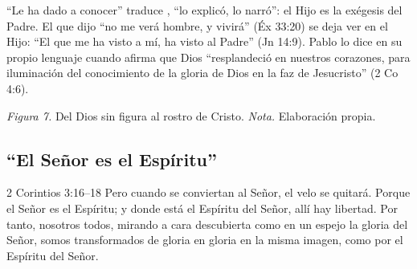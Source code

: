 ``Le ha dado a conocer'' traduce , ``lo explicó, lo narró'': el Hijo es la exégesis del Padre. El que dijo ``no me verá hombre, y vivirá'' (Éx 33:20) se deja ver en el Hijo: ``El que me ha visto a mí, ha visto al Padre'' (Jn 14:9). Pablo lo dice en su propio lenguaje cuando afirma que Dios ``resplandeció en nuestros corazones, para iluminación del conocimiento de la gloria de Dios en la faz de Jesucristo'' (2 Co 4:6).

\begin{center}
\par
{\footnotesize\color{gris}\textit{Figura 7.} Del Dios sin figura al rostro de Cristo. \textit{Nota.} Elaboración propia.}
\end{center}


\subsection{“El Señor es el Espíritu”}

\begin{verso}{2 Corintios 3:16–18}
Pero cuando se conviertan al Señor, el velo se quitará. Porque el Señor es el Espíritu; y donde está el Espíritu del Señor, allí hay libertad. Por tanto, nosotros todos, mirando a cara descubierta como en un espejo la gloria del Señor, somos transformados de gloria en gloria en la misma imagen, como por el Espíritu del Señor.
\end{verso}

